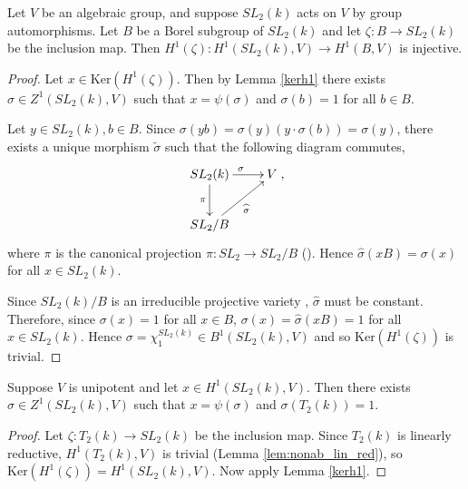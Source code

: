 \begin{lemma} Let $V$ be an algebraic group, and suppose $SL_2(k)$ acts on $V$ by group automorphisms. Let $B$ be a Borel subgroup of $SL_2(k)$ and let $\zeta: B \rightarrow SL_2(k)$ be the inclusion map. Then $H^1(\zeta): H^1(SL_2(k), V)\rightarrow H^1(B, V)$ is injective.
  \label{sl2_b_inj}
\end{lemma}
\begin{proof}
Let $x \in \mathrm{Ker}\left(H^1(\zeta)\right)$. Then by Lemma \ref{kerh1} there exists $\sigma \in Z^1(SL_2(k), V)$ such that $x = \psi(\sigma)$ and $\sigma(b) = 1$ for all $b \in B$.

Let $y\in SL_2(k), b \in B$. Since $\sigma(yb) = \sigma(y)(y\cdot \sigma(b)) = \sigma(y)$, there exists a unique morphism $\widetilde{\sigma}$ such that the following diagram commutes,
\begin{align*}
	\xymatrix{
	SL_2(k) \ar[r]^{\sigma} \ar[d]_{\pi} & V\\
	SL_2/B \ar[ru]_{\widehat{\sigma}}
	},
\end{align*}
where $\pi$ is the canonical projection $\pi:SL_2 \rightarrow SL_2/B$ (\cite[\S 23.3]{humphreys1975linear}). Hence $\widehat{\sigma}(xB) = \sigma(x)$ for all $x \in SL_2(k)$.

Since $SL_2(k)/B$ is an irreducible projective variety \cite[Theorem 21.3]{humphreys1975linear}, $\widehat{\sigma}$ must be constant. Therefore, since $\sigma(x) = 1$ for all $x \in B$, $\sigma(x) = \widehat{\sigma}(xB) = 1$ for all $x \in SL_2(k)$. Hence $\sigma = \chi^{SL_2(k)}_1 \in B^1(SL_2(k), V)$ and so $\mathrm{Ker}\left(H^1(\zeta)\right)$ is trivial.
\end{proof} 

\begin{lemma}\label{trivial_on_t} Suppose $V$ is unipotent and let $x \in H^1(SL_2(k), V)$. Then there exists $\sigma \in Z^1(SL_2(k), V)$ such that $x = \psi(\sigma)$ and $\sigma\left(T_2(k)\right) = 1$.
\end{lemma}
\begin{proof}
	Let $\zeta:T_2(k) \rightarrow SL_2(k)$ be the inclusion map. Since $T_2(k)$ is linearly reductive, $H^1(T_2(k), V)$ is trivial (Lemma \ref{lem:nonab_lin_red}), so $\mathrm{Ker}\left(H^1(\zeta)\right) = H^1(SL_2(k), V)$. Now apply Lemma \ref{kerh1}.
\end{proof}
